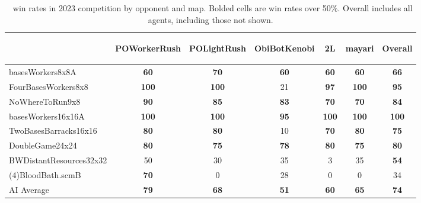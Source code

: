 \documentclass{article}
\begin{document}
\begin{table}[ht]
    \caption{\agentName\ win rates in 2023 competition by opponent and map. Bolded cells are win rates over 50\%. Overall includes all agents, including those not shown.}
    \label{tab:competition-winrate-by-map}
    \begin{center}
    \begin{tabular}{lccccc|c}
    & \begin{sideways}POWorkerRush\end{sideways} & \begin{sideways}POLightRush\end{sideways} & \begin{sideways}ObiBotKenobi\end{sideways} & \begin{sideways}2L\end{sideways} & \begin{sideways}mayari\end{sideways} & \begin{sideways}Overall\end{sideways}\\ 
    \midrule
    basesWorkers8x8A & \textbf{60} & \textbf{70} & \textbf{60} & \textbf{60} & \textbf{60} & \textbf{66}\\ 
    FourBasesWorkers8x8 & \textbf{100} & \textbf{100} & 21 & \textbf{97} & \textbf{100} & \textbf{95}\\ 
    NoWhereToRun9x8 & \textbf{90} & \textbf{85} & \textbf{83} & \textbf{70} & \textbf{70} & \textbf{84}\\
    basesWorkers16x16A & \textbf{100} & \textbf{100} & \textbf{95} & \textbf{100} & \textbf{100} & \textbf{100}\\
    TwoBasesBarracks16x16 & \textbf{80} & \textbf{80} & 10 & \textbf{70} & \textbf{80} & \textbf{75}\\
    DoubleGame24x24 & \textbf{80} & \textbf{75} & \textbf{78} & \textbf{80} & \textbf{75} & \textbf{80}\\ 
    BWDistantResources32x32 & 50 & 30 & 35 & 3 & 35 & \textbf{54}\\
    (4)BloodBath.scmB & \textbf{70} & 0 & 28 & 0 & 0 & 34\\ 
    \hline
    AI Average & \textbf{79} & \textbf{68} & \textbf{51} & \textbf{60} & \textbf{65} & \textbf{74}\\ 
    \end{tabular}
    \end{center}
\end{table}
\end{document}
